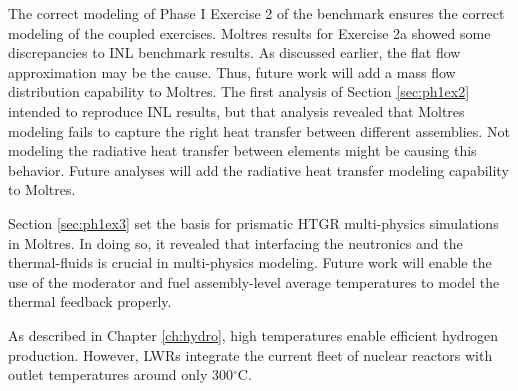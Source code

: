 The correct modeling of Phase I Exercise 2 of the benchmark ensures the correct modeling of the coupled exercises.
Moltres results for Exercise 2a showed some discrepancies to INL benchmark results.
As discussed earlier, the flat flow approximation may be the cause.
Thus, future work will add a mass flow distribution capability to Moltres.
The first analysis of Section \ref{sec:ph1ex2} intended to reproduce INL results, but that analysis revealed that Moltres modeling fails to capture the right heat transfer between different assemblies.
Not modeling the radiative heat transfer between elements might be causing this behavior.
Future analyses will add the radiative heat transfer modeling capability to Moltres.

Section \ref{sec:ph1ex3} set the basis for prismatic HTGR multi-physics simulations in Moltres.
In doing so, it revealed that interfacing the neutronics and the thermal-fluids is crucial in multi-physics modeling.
Future work will enable the use of the moderator and fuel assembly-level average temperatures to model the thermal feedback properly.



As described in Chapter \ref{ch:hydro}, high temperatures enable efficient hydrogen production.
However, LWRs integrate the current fleet of nuclear reactors with outlet temperatures around only 300$^{\circ}$C.

